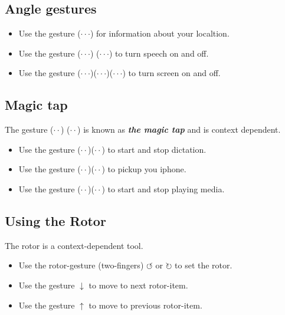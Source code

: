 \documentclass[a4paper, landscape, 10pt]{scrartcl}
\begin{document}
\begin{multicols}{2}
\subsection*{Angle gestures}
\begin{itemize}
\item{ Use the gesture ($\cdot\cdot\cdot$) for information about your localtion.}
\item{ Use the gesture ($\cdot\cdot\cdot$) ($\cdot\cdot\cdot$) to turn speech on and off.}
\item{ Use the gesture ($\cdot\cdot\cdot$)($\cdot\cdot\cdot$)($\cdot\cdot\cdot$) to turn screen on and off.}
\end{itemize}

\subsection*{Magic tap}
The gesture  ($\cdot\cdot$) ($\cdot\cdot$) is known as \textbf{\textit{the magic tap}} and is context dependent.
\begin{itemize}
\item{ Use the gesture ($\cdot\cdot$)($\cdot\cdot$)  to start and stop dictation.}
\item{ Use the gesture ($\cdot\cdot$)($\cdot\cdot$) to pickup you iphone.}
\item{ Use the gesture ($\cdot\cdot$)($\cdot\cdot$) to start and stop playing media.}
\end{itemize}

\subsection*{Using the Rotor}
The rotor is a context-dependent tool. 
\begin{itemize}
\item{Use the rotor-gesture (two-fingers) $\circlearrowleft{}$ or $\circlearrowright$ to set the rotor.}
\item{Use the gesture $\downarrow$ to move to next rotor-item.}
\item{Use the gesture $\uparrow$ to move to previous rotor-item.}
\end{itemize}

\end{multicols}

\hrulefill{}
\end{document}
